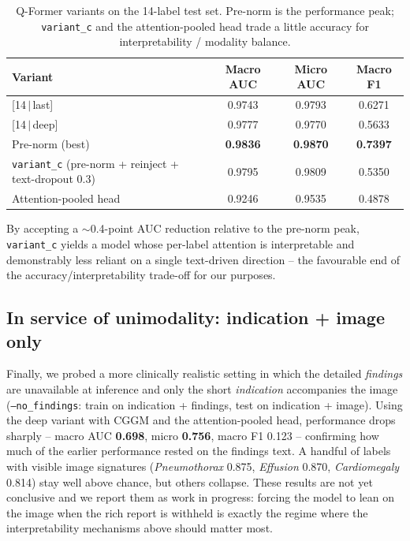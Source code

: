 \documentclass[11pt]{article}
\begin{document}
\begin{table}[H]
\centering
\caption{Q-Former variants on the 14-label test set. Pre-norm is the performance
peak; \texttt{variant\_c} and the attention-pooled head trade a little accuracy for
interpretability / modality balance.}
\label{tab:qf-variants}
\begin{tabular}{lccc}
\toprule
Variant & Macro AUC & Micro AUC & Macro F1 \\
\midrule
{[14$\,|\,$last]}                 & 0.9743 & 0.9793 & 0.6271 \\
{[14$\,|\,$deep]}                 & 0.9777 & 0.9770 & 0.5633 \\
Pre-norm (best)                 & \textbf{0.9836} & \textbf{0.9870} & \textbf{0.7397} \\
\texttt{variant\_c} (pre-norm + reinject + text-dropout 0.3) & 0.9795 & 0.9809 & 0.5350 \\
Attention-pooled head           & 0.9246 & 0.9535 & 0.4878 \\
\bottomrule
\end{tabular}
\end{table}

By accepting a $\sim$0.4-point AUC reduction relative to the pre-norm peak,
\texttt{variant\_c} yields a model whose per-label attention is interpretable and
demonstrably less reliant on a single text-driven direction -- the favourable end of
the accuracy/interpretability trade-off for our purposes.

\subsection{In service of unimodality: indication + image only}

Finally, we probed a more clinically realistic setting in which the detailed
\emph{findings} are unavailable at inference and only the short \emph{indication}
accompanies the image (\texttt{--no\_findings}: train on indication + findings, test
on indication + image). Using the deep variant with CGGM and the attention-pooled
head, performance drops sharply -- macro AUC \textbf{0.698}, micro \textbf{0.756},
macro F1 0.123 -- confirming how much of the earlier performance rested on the
findings text. A handful of labels with visible image signatures (\emph{Pneumothorax}
0.875, \emph{Effusion} 0.870, \emph{Cardiomegaly} 0.814) stay well above chance, but
others collapse. These results are not yet conclusive and we report them as
work in progress: forcing the model to lean on the image when the rich report is
withheld is exactly the regime where the interpretability mechanisms above should
matter most.
\end{document}
